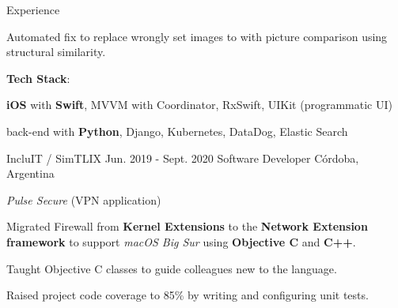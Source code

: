 \documentclass{curriculum}
\begin{document}
\begin{cvsection}{Experience}
\begin{sectionitemlist}
        \item{
            Automated fix to replace wrongly set images to with
            picture comparison using structural similarity.
        }

        \item{
            \textbf{Tech Stack}:
        }{
            \begin{colsectionitemlist}{1}
            \item{
                \textbf{iOS} with \textbf{Swift},
                MVVM with Coordinator,
                RxSwift,
                UIKit (programmatic UI)
            }
            \item{
                back-end with \textbf{Python},
                Django,
                Kubernetes,
                DataDog,
                Elastic Search
            }
            \end{colsectionitemlist}
        }

        \end{sectionitemlist}


    \makesectionitemheader
        {IncluIT / SimTLIX}                             {Jun. 2019 - Sept. 2020}
        {Software Developer}                                {Córdoba, Argentina}

        \begin{sectionitemlist}

        \item{\textit{Pulse Secure} (VPN application)}
            \begin{sectionitemlist}
            \item{
                Migrated Firewall from \textbf{Kernel Extensions} to the
                \textbf{Network Extension framework} to support \textit{macOS Big Sur}
                using \textbf{Objective C} and \textbf{C++}.
            }
            \item{
                Taught Objective C classes to guide colleagues new to the language.
            }
            \item{
                Raised project code coverage to 85\% by writing and configuring unit tests.
            }
            \end{sectionitemlist}


\end{sectionitemlist}
\end{cvsection}
\end{document}
